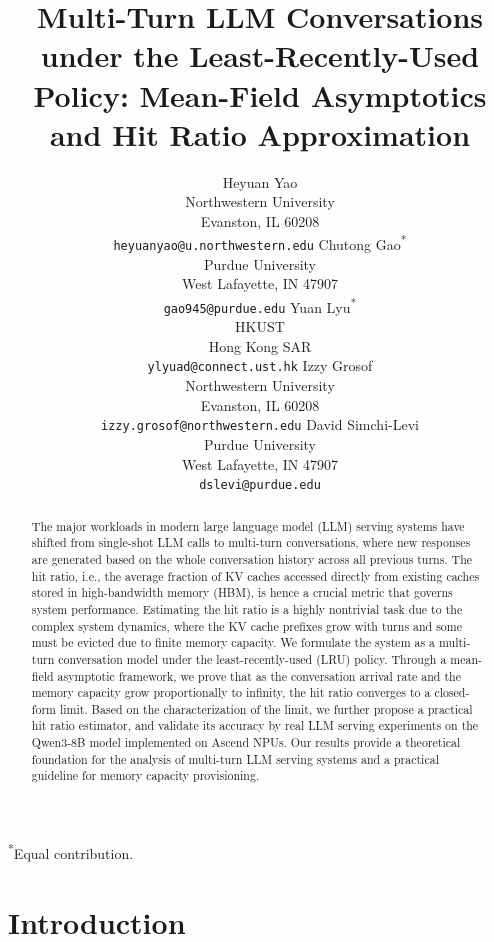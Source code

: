 \documentclass{article}
\title{Multi-Turn LLM Conversations under the Least-Recently-Used Policy: Mean-Field Asymptotics and Hit Ratio Approximation}
\author{
  Heyuan Yao \\
  Northwestern University\\
  Evanston, IL 60208 \\
  \texttt{heyuanyao@u.northwestern.edu}
  \And
  Chutong Gao\textsuperscript{*} \\
  Purdue University \\
  West Lafayette, IN 47907\\
  \texttt{gao945@purdue.edu}
  \AND
  Yuan Lyu\textsuperscript{*} \\
  HKUST\\
  Hong Kong SAR\\
  \texttt{ylyuad@connect.ust.hk}
  \And
  Izzy Grosof \\
  Northwestern University\\
  Evanston, IL 60208 \\
  \texttt{izzy.grosof@northwestern.edu}
  \And
  David Simchi-Levi \\
  Purdue University \\
  West Lafayette, IN 47907\\
  \texttt{dslevi@purdue.edu}
  \AND
}
\date{}
\theoremstyle{definition}
\begin{document}
\maketitle

\vspace{-5.5em}
\begin{center}
\small \textsuperscript{*}Equal contribution.
\end{center}
\vspace{0.5em}

\begin{abstract}
The major workloads in modern large language model (LLM) serving systems have shifted from single-shot LLM calls to multi-turn conversations, where new responses are generated based on the whole conversation history across all previous turns.    
The hit ratio, i.e., the average fraction of KV caches accessed directly from existing caches stored in high-bandwidth memory (HBM), is hence a crucial metric that governs system performance. Estimating the hit ratio is a highly nontrivial task due to the complex system dynamics, where the KV cache prefixes grow with turns and some must be evicted due to finite memory capacity. We formulate the system as a multi-turn conversation model under the least-recently-used (LRU) policy. Through a mean-field asymptotic framework, we prove that as the conversation arrival rate and the memory capacity grow proportionally to infinity, the hit ratio converges to a closed-form limit. Based on the characterization of the limit, we further propose a practical hit ratio estimator, and validate its accuracy by real LLM serving experiments on the Qwen3-8B model implemented on Ascend NPUs. Our results provide a theoretical foundation for the analysis of multi-turn LLM serving systems and a practical guideline for memory capacity provisioning.
\end{abstract}

\vspace{-0.5em}

\vspace{-0.5em}
\vspace{-0.5em}

\section{Introduction}
\label{sec: Introduction}
\vspace{-0.5em}
\vspace{-0.2em}
\end{document}
